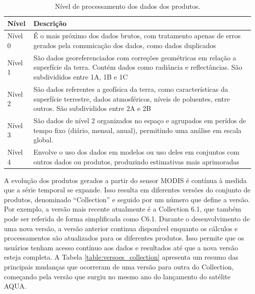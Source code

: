 \documentclass[cic,tc]{iiufrgs}
\begin{document}
\begin{table}[!htb]
\centering
\caption{Nível de processamento dos dados dos produtos.}
\begin{tabular}{ @{}lp{12cm}@{} }
  \toprule
  \textbf{Nível} & \textbf{Descrição} \\
  \midrule
  Nível 0 & É o mais próximo dos dados brutos, com tratamento apenas de erros gerados pela comunicação dos dados, como dados duplicados \\
  Nível 1 & São dados georeferenciados com correções geométricas em relação a superfície da terra. Contém dados como radiância e reflectâncias. São subdivididos entre 1A, 1B e 1C \\
  Nível 2 & São dados referentes a geofísica da terra, como características da superfície terrestre, dados atmosféricos, níveis de poluentes, entre outros. São subdivididos entre 2A e 2B \\
  Nível 3 & São dados de nível 2 organizados no espaço e agrupados em perídos de tempo fixo (diário, mensal, anual), permitindo uma análise em escala global. \\
  Nível 4 & Envolve o uso dos dados em modelos ou uso deles em conjuntos com outros dados ou produtos, produzindo estimativas mais aprimoradas \\
  \bottomrule
\end{tabular}
\label{table:nivel_processamento_produtos}
\end{table}

A evolução dos produtos gerados a partir do sensor MODIS é contínua à medida que a série temporal se expande. Isso resulta em diferentes versões do conjunto de produtos, denominado ``Collection'' e seguido por um número que define a versão. Por exemplo, a versão mais recente atualmente é a Collection 6.1, que também pode ser referida de forma simplificada como C6.1. Durante o desenvolvimento de uma nova versão, a versão anterior continua disponível enquanto os cálculos e processamentos são atualizados para os diferentes produtos. Isso permite que os usuários tenham acesso contínuo aos dados e resultados até que a nova versão esteja completa. A Tabela \ref{table:versoes_collection} apresenta um resumo das principais mudanças que ocorreram de uma versão para outra do Collection, começando pela versão que surgiu no mesmo ano do lançamento do satélite AQUA.
\end{document}
